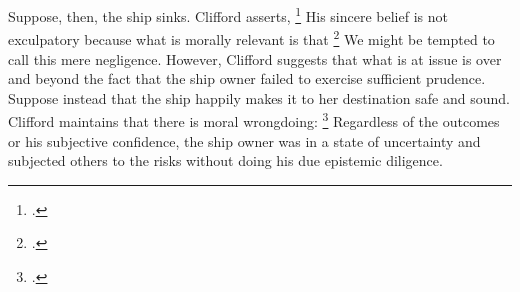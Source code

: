 \documentclass[letterpaper,notitlepage,12pt]{article}
\begin{document}
Suppose, then, the ship sinks.
Clifford asserts, \footcite[p. 339]{clifford_ethics_1886}
His sincere belief is not exculpatory because what is morally relevant is that
\footcite[p. 340]{clifford_ethics_1886}
We might be tempted to call this mere negligence.
However, Clifford suggests that what is at issue is over and beyond the fact
that the ship owner failed to exercise sufficient prudence.
Suppose instead that the ship happily makes it to her destination safe and
sound.
Clifford maintains that there is moral wrongdoing: \footcite[p. 340]{clifford_ethics_1886}
Regardless of the outcomes or his subjective confidence, the ship owner was in a state of 
uncertainty and subjected others to the risks without doing his due
epistemic diligence.
\end{document}
